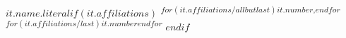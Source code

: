 
{$it.name.literal$}$if(it.affiliations)$
\textsuperscript{%
$for(it.affiliations/allbutlast)$$it.number$,$endfor$%
$for(it.affiliations/last)$$it.number$$endfor$%
}%
$endif$
